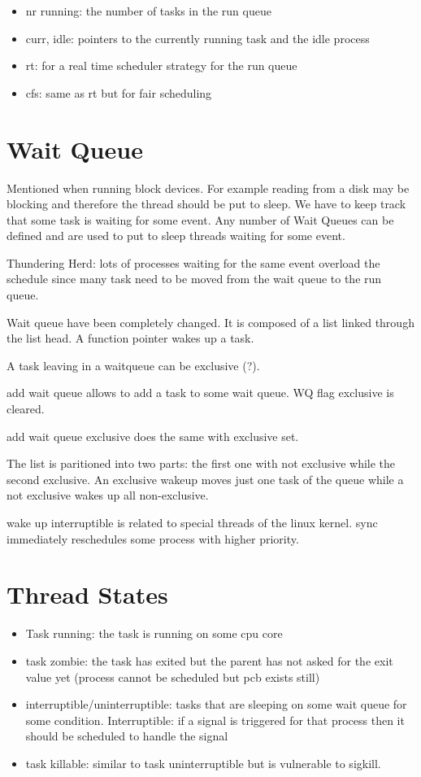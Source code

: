 \documentclass[twoside]{article}
\begin{document}
\begin{itemize}
    \item nr running: the number of tasks in the run queue
    \item curr, idle: pointers to the currently running task and the idle
        process
    \item rt: for a real time scheduler strategy for the run queue
    \item cfs: same as rt but for fair scheduling
\end{itemize}


\section{Wait Queue}
\label{sec:Wait Queue}

Mentioned when running block devices. For example reading from a disk may be
blocking and therefore the thread should be put to sleep. We have to keep track
that some task is waiting for some event. Any number of Wait Queues can be
defined and are used to put to sleep threads waiting for some event.

Thundering Herd: lots of processes waiting for the same event overload the
schedule since many task need to be moved from the wait queue to the run queue.

Wait queue have been completely changed. It is composed of a list linked through
the list head. A function pointer wakes up a task.

A task leaving in a waitqueue can be exclusive (?).

add wait queue allows to add a task to some wait queue. WQ flag exclusive is
cleared.

add wait queue exclusive does the same with exclusive set.

The list is paritioned into two parts: the first one with not exclusive while
the second exclusive. An exclusive wakeup moves just one task of the queue while
a not exclusive wakes up all non-exclusive.

wake up interruptible is related to special threads of the linux kernel. sync
immediately reschedules some process with higher priority.


\section{Thread States}
\label{sec:Thread States}

\begin{itemize}
    \item Task running: the task is running on some cpu core
    \item task zombie: the task has exited but the parent has not asked for the
        exit value yet (process cannot be scheduled but pcb exists still)
    \item interruptible/uninterruptible: tasks that are sleeping on some wait
        queue for some condition. Interruptible: if a signal is triggered for
        that process then it should be scheduled to handle the signal
    \item task killable: similar to task uninterruptible but is vulnerable to
        sigkill.
\end{itemize}
\end{document}
